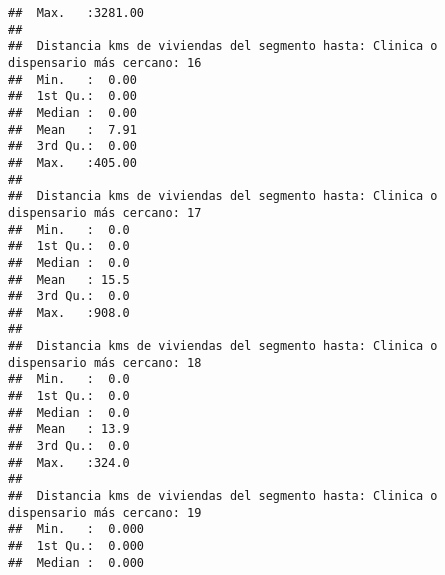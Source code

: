 \documentclass[11pt,]{article}
\begin{document}
\begin{verbatim}
##  Max.   :3281.00                                                                     
##                                                                                      
##  Distancia kms de viviendas del segmento hasta: Clinica o dispensario más cercano: 16
##  Min.   :  0.00                                                                      
##  1st Qu.:  0.00                                                                      
##  Median :  0.00                                                                      
##  Mean   :  7.91                                                                      
##  3rd Qu.:  0.00                                                                      
##  Max.   :405.00                                                                      
##                                                                                      
##  Distancia kms de viviendas del segmento hasta: Clinica o dispensario más cercano: 17
##  Min.   :  0.0                                                                       
##  1st Qu.:  0.0                                                                       
##  Median :  0.0                                                                       
##  Mean   : 15.5                                                                       
##  3rd Qu.:  0.0                                                                       
##  Max.   :908.0                                                                       
##                                                                                      
##  Distancia kms de viviendas del segmento hasta: Clinica o dispensario más cercano: 18
##  Min.   :  0.0                                                                       
##  1st Qu.:  0.0                                                                       
##  Median :  0.0                                                                       
##  Mean   : 13.9                                                                       
##  3rd Qu.:  0.0                                                                       
##  Max.   :324.0                                                                       
##                                                                                      
##  Distancia kms de viviendas del segmento hasta: Clinica o dispensario más cercano: 19
##  Min.   :  0.000                                                                     
##  1st Qu.:  0.000                                                                     
##  Median :  0.000                                                                     

\end{verbatim}
\end{document}
